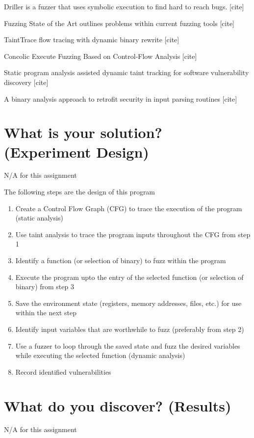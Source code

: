 \documentclass[conference]{IEEEtran}
\begin{document}
Driller is a fuzzer that uses symbolic execution to find hard to reach bugs. [cite]

Fuzzing State of the Art outlines problems within current fuzzing tools [cite]

TaintTrace flow tracing with dynamic binary rewrite [cite]

Concolic Execute Fuzzing Based on Control-Flow Analysis [cite]

Static program analysis assisted dynamic taint tracking for software vulnerability discovery [cite]

A binary analysis approach to retrofit security in input parsing routines [cite]

\section{What is your solution? (Experiment Design)}
N/A for this assignment

The following steps are the design of this program
\begin{enumerate}
\item Create a Control Flow Graph (CFG) to trace the execution of the program (static analysis)
\item Use taint analysis to trace the program inputs throughout the CFG from step 1
\item Identify a function (or selection of binary) to fuzz within the program
\item Execute the program upto the entry of the selected function (or selection of binary) from step 3 
\item Save the environment state (registers, memory addresses, files, etc.) for use within the next step
\item Identify input variables that are worthwhile to fuzz (preferably from step 2)
\item Use a fuzzer to loop through the saved state and fuzz the desired variables while executing the selected function (dynamic analysis)
\item Record identified vulnerabilities
\end{enumerate}


\section{What do you discover? (Results)}
N/A for this assignment

\nocite{*}


\end{document}
